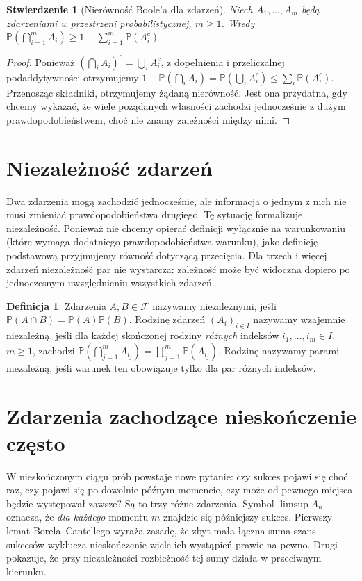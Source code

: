 \documentclass[11pt,a4paper,oneside]{report}
\numberwithin{equation}{chapter}
\theoremstyle{plain}
\newtheorem{stwierdzenie}[twierdzenie]{Stwierdzenie}
\theoremstyle{definition}
\newtheorem{definicja}{Definicja}[chapter]
\theoremstyle{remark}
\newcommand{\Prob}{\mathbb{P}}
\begin{document}
\begin{stwierdzenie}[Nierówność Boole'a dla zdarzeń]
Niech $A_1,\ldots,A_m$ będą zdarzeniami w przestrzeni
probabilistycznej, $m\geq1$. Wtedy
$\Prob(\bigcap_{i=1}^m A_i)
\geq 1-\sum_{i=1}^m\Prob(A_i^c)$.
\end{stwierdzenie}
\begin{proof}
Ponieważ $(\bigcap_i A_i)^c=\bigcup_i A_i^c$,
z dopełnienia i przeliczalnej podaddytywności otrzymujemy
$1-\Prob(\bigcap_i A_i)
=\Prob(\bigcup_i A_i^c)\leq\sum_i\Prob(A_i^c)$.
Przenosząc składniki, otrzymujemy żądaną nierówność.
Jest ona przydatna, gdy chcemy wykazać, że wiele
pożądanych własności zachodzi jednocześnie z dużym
prawdopodobieństwem, choć nie znamy zależności między nimi.
\end{proof}

\section{Niezależność zdarzeń}
Dwa zdarzenia mogą zachodzić jednocześnie, ale informacja
o jednym z nich nie musi zmieniać prawdopodobieństwa drugiego.
Tę sytuację formalizuje niezależność. Ponieważ nie chcemy
opierać definicji wyłącznie na warunkowaniu (które wymaga dodatniego
prawdopodobieństwa warunku), jako definicję podstawową przyjmujemy
równość dotyczącą przecięcia. Dla trzech i więcej zdarzeń
niezależność par nie wystarcza: zależność może być widoczna
dopiero po jednoczesnym uwzględnieniu wszystkich zdarzeń.

\begin{definicja}
Zdarzenia $A,B\in\mathcal F$ nazywamy niezależnymi, jeśli
$\Prob(A\cap B)=\Prob(A)\Prob(B)$.
Rodzinę zdarzeń $(A_i)_{i\in I}$ nazywamy wzajemnie niezależną,
jeśli dla każdej skończonej rodziny \emph{różnych} indeksów
$i_1,\ldots,i_m\in I$, $m\geq1$, zachodzi
$\Prob(\bigcap_{j=1}^m A_{i_j})=\prod_{j=1}^m\Prob(A_{i_j})$.
Rodzinę nazywamy parami niezależną, jeśli warunek ten obowiązuje
tylko dla par różnych indeksów.
\end{definicja}

\section{Zdarzenia zachodzące nieskończenie często}
W nieskończonym ciągu prób powstaje nowe pytanie: czy sukces
pojawi się choć raz, czy pojawi się po dowolnie późnym momencie,
czy może od pewnego miejsca będzie występował zawsze? Są to
trzy różne zdarzenia. Symbol $\limsup A_n$ oznacza, że
\emph{dla każdego} momentu $m$ znajdzie się późniejszy sukces.
Pierwszy lemat Borela--Cantellego wyraża zasadę, że zbyt mała
łączna suma szans sukcesów wyklucza nieskończenie wiele ich
wystąpień prawie na pewno. Drugi pokazuje, że przy niezależności
rozbieżność tej sumy działa w przeciwnym kierunku.
\end{document}

